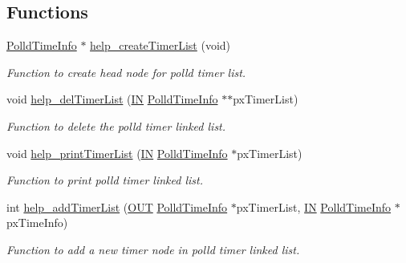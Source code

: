 \subsection*{Functions}
\begin{DoxyCompactItemize}
\item 
\hyperlink{group__SYSFRAMEWORK__POLLD_gaac3d35d6a6150660580f1c201baf5ca9}{Polld\-Time\-Info} $\ast$ \hyperlink{group__SYSFRAMEWORK__POLLD_gae320b4db14b8f6d6c2cb985921722afa}{help\-\_\-create\-Timer\-List} (void)
\begin{DoxyCompactList}\small\item\em Function to create head node for polld timer list. \end{DoxyCompactList}\item 
void \hyperlink{group__SYSFRAMEWORK__POLLD_gaf539f6e7bd349a8e5f3203efda7448f4}{help\-\_\-del\-Timer\-List} (\hyperlink{group__LIBHELP_gac2bbd6d630a06a980d9a92ddb9a49928}{I\-N} \hyperlink{group__SYSFRAMEWORK__POLLD_gaac3d35d6a6150660580f1c201baf5ca9}{Polld\-Time\-Info} $\ast$$\ast$px\-Timer\-List)
\begin{DoxyCompactList}\small\item\em Function to delete the polld timer linked list. \end{DoxyCompactList}\item 
void \hyperlink{group__SYSFRAMEWORK__POLLD_ga7b5d0762e28e4e09406a75548c61bb4c}{help\-\_\-print\-Timer\-List} (\hyperlink{group__LIBHELP_gac2bbd6d630a06a980d9a92ddb9a49928}{I\-N} \hyperlink{group__SYSFRAMEWORK__POLLD_gaac3d35d6a6150660580f1c201baf5ca9}{Polld\-Time\-Info} $\ast$px\-Timer\-List)
\begin{DoxyCompactList}\small\item\em Function to print polld timer linked list. \end{DoxyCompactList}\item 
int \hyperlink{group__SYSFRAMEWORK__POLLD_ga8de5216d3d5e3b7b979c6fc189d35ade}{help\-\_\-add\-Timer\-List} (\hyperlink{group__LIBHELP_gaec78e7a9e90a406a56f859ee456e8eae}{O\-U\-T} \hyperlink{group__SYSFRAMEWORK__POLLD_gaac3d35d6a6150660580f1c201baf5ca9}{Polld\-Time\-Info} $\ast$px\-Timer\-List, \hyperlink{group__LIBHELP_gac2bbd6d630a06a980d9a92ddb9a49928}{I\-N} \hyperlink{group__SYSFRAMEWORK__POLLD_gaac3d35d6a6150660580f1c201baf5ca9}{Polld\-Time\-Info} $\ast$px\-Time\-Info)
\begin{DoxyCompactList}\small\item\em Function to add a new timer node in polld timer linked list. \end{DoxyCompactList}\item 
$$
\end{DoxyCompactItemize}
